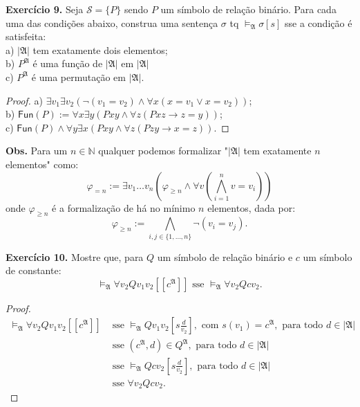 \documentclass[11pt]{article}
\newcommand{\mc}[1]{\mathcal{#1}}
\newcommand{\mf}[1]{\mathfrak{#1}}
\newcommand{\msf}[1]{\mathsf{#1}}
\newcommand{\mbb}[1]{\mathbb{#1}}
\begin{document}
\begin{shaded}
\textbf{Exercício 9.} Seja $\mc{S}=\{P\}$ sendo $P$ um símbolo de relação binário. Para cada uma das condições abaixo, construa uma sentença $\sigma$ tq $\vDash_\mf{A}\sigma[s]$ sse a condição é satisfeita:\\
a) $|\mf{A}|$ tem exatamente dois elementos;\\
b) $P^\mf{A}$ é uma função de $|\mf{A}|$ em $|\mf{A}|$\\
c) $P^\mf{A}$ é uma permutação em $|\mf{A}|$.
\end{shaded}

\begin{proof}
    a) $\exists v_1\exists v_2(\neg(v_1=v_2)\wedge\forall x(x=v_1\vee x=v_2))$;\\
    b) $\msf{Fun}(P):=\forall x\exists y(Pxy\wedge\forall z(Pxz\to z=y))$;\\
    c) $\msf{Fun}(P)\wedge\forall y\exists x(Pxy\wedge\forall z(Pzy\to x=z))$.
\end{proof}

\begin{shaded}
\textbf{Obs.} Para um $n\in\mbb{N}$ qualquer podemos formalizar "$|\mf{A}|$ tem exatamente $n$ elementos" como:
$$\varphi_{=n}:=\exists v_1\dots v_n\left(\varphi_{\geq n}\wedge\forall v\left(\bigwedge_{i=1}^n v=v_i\right)\right)$$
onde $\varphi_{\geq n}$ é a formalização de há no mínimo $n$ elementos, dada por:
$$\varphi_{\geq n}:=\bigwedge_{i,j\in\{1,\dots,n\}}\neg(v_i=v_j).$$
\end{shaded}

\begin{shaded}
\textbf{Exercício 10.} Mostre que, para $Q$ um símbolo de relação binário e $c$ um símbolo de constante:
$$\vDash_\mf{A}\forall v_2Qv_1v_2[\![c^\mf{A}]\!]\text{ sse }\vDash_\mf{A}\forall v_2Qcv_2.$$
\end{shaded}

\begin{proof}
    \begin{align*}
        \vDash_\mf{A}\forall v_2Qv_1v_2[\![c^\mf{A}]\!] & \text{ sse }\vDash_\mf{A}Qv_1v_2\left[s\tfrac{d}{v_2}\right],\text{ com }s(v_1)=c^\mf{A},\text{ para todo }d\in|\mf{A}|\\
        & \text{ sse }\left(c^\mf{A},d\right)\in Q^\mf{A},\text{ para todo }d\in|\mf{A}|\\
        & \text{ sse }\vDash_\mf{A}Qcv_2\left[s\tfrac{d}{v_2}\right],\text{ para todo }d\in|\mf{A}|\\
        & \text{ sse }\forall v_2Qcv_2.
    \end{align*}
\end{proof}
\end{document}

